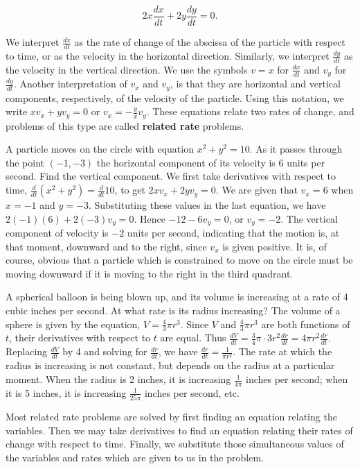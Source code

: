 $$
2x \frac{dx}{dt} + 2y \frac{dy}{dt} = 0.
$$

We interpret $\frac{dx}{dt}$ as the rate of change of the abscissa of the particle with respect to time, or as the velocity in the horizontal direction. Similarly, we interpret $\frac{dy}{dt}$ as the velocity in the vertical direction. We use the symbols $v = x$ for $\frac{dx}{dt}$ and $v_y$ for $\frac{dy}{dt}$. Another interpretation of $v_x$ and $v_y$, is that they are horizontal and vertical components, respectively, of the velocity of the particle. Using this notation, we write $xv_x + yv_y = 0$ or $v_x = -\frac{y}{x}v_y$. These equations relate two rates of change, and problems of this type are called
\textbf{related rate} problems.
\medskip

\begin{example} 
A particle moves on the circle with equation $x^2 + y^2 = 10$. As it passes through the point $(- 1, - 3)$ the horizontal component of its velocity is 6 units per second. Find the vertical component. We first take derivatives with respect to time, $\frac{d}{dt}(x^2 + y^2) = \frac{d}{dt} 10$, to get $2xv_x + 2yv_y = 0$.
We are given that $v_x = 6$ when $x = -1$ and $y = -3$. Substituting these values in the last equation, we have $2(-1)(6) + 2(-3)v_y = 0$. Hence $-12 - 6v_y = 0$, or $v_y = -2$. The vertical component of velocity is $-2$ units per second, indicating that the motion is, at that moment, downward and to the right, since $v_x$ is given positive. It is, of course, obvious that a particle which is constrained to move on the circle must be moving downward if it is moving to the right in the third quadrant.
\end{example}
\medskip

\begin{example}
A spherical balloon is being blown up, and its volume is increasing at a rate of 4 cubic inches per second. At what rate is its radius increasing? The volume of a sphere is given by the equation, $V= \frac{4}{3}\pi r^3$. Since $V$ and $\frac{4}{3}\pi r^3$ are both functions of $t$, their derivatives with respect to $t$ are equal. Thus $\frac{dV}{dt} = \frac{3}{4}\pi \cdot 3r^2 \frac{dr}{dt} = 4 \pi r^2 \frac{dr}{dt}.$ Replacing $\frac{dV}{dt}$ by 4 and solving for $\frac{dr}{dt}$, we have $\frac{dr}{dt} = \frac{1}{\pi r^2}$. The rate at which the radius is increasing is not constant, but depends on the radius at a particular moment. When the radius is 2 inches, it is increasing $\frac{1}{4 \pi}$ inches per second; when it is 5 inches, it is increasing $\frac{1}{25 \pi}$ inches per second, etc.
\end{example}
\medskip

Most related rate problems are solved by first finding an equation relating the variables. Then we may take derivatives to find an equation relating their rates of change with respect to time. Finally, we substitute those simultaneous values of the variables and rates which are given to us in the problem.
